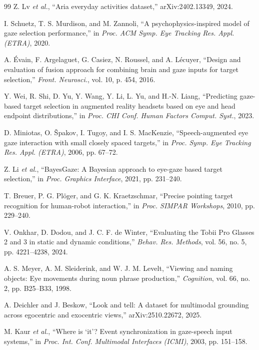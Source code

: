 \documentclass[letterpaper, 10 pt, conference]{ieeeconf}  %
\begin{document}
\begin{thebibliography}{99}
Z. Lv \emph{et al.}, ``Aria everyday activities dataset,''
arXiv:2402.13349, 2024.

I. Schuetz, T. S. Murdison, and M. Zannoli, ``A psychophysics-inspired
model of gaze selection performance,'' in \emph{Proc. ACM Symp. Eye
Tracking Res. Appl. (ETRA)}, 2020.

A. \'Evain, F. Argelaguet, G. Casiez, N. Roussel, and A. L\'ecuyer,
``Design and evaluation of fusion approach for combining brain and
gaze inputs for target selection,'' \emph{Front. Neurosci.}, vol. 10,
p. 454, 2016.

Y. Wei, R. Shi, D. Yu, Y. Wang, Y. Li, L. Yu, and H.-N. Liang,
``Predicting gaze-based target selection in augmented reality headsets
based on eye and head endpoint distributions,'' in \emph{Proc. CHI
Conf. Human Factors Comput. Syst.}, 2023.

D. Miniotas, O. \v{S}pakov, I. Tugoy, and I. S. MacKenzie,
``Speech-augmented eye gaze interaction with small closely spaced
targets,'' in \emph{Proc. Symp. Eye Tracking Res. Appl. (ETRA)},
2006, pp. 67--72.

Z. Li \emph{et al.}, ``BayesGaze: A Bayesian approach to eye-gaze
based target selection,'' in \emph{Proc. Graphics Interface}, 2021,
pp. 231--240.

T. Breuer, P. G. Pl\"oger, and G. K. Kraetzschmar, ``Precise pointing
target recognition for human-robot interaction,'' in \emph{Proc.
SIMPAR Workshops}, 2010, pp. 229--240.

V. Onkhar, D. Dodou, and J. C. F. de Winter, ``Evaluating the Tobii
Pro Glasses 2 and 3 in static and dynamic conditions,'' \emph{Behav.
Res. Methods}, vol. 56, no. 5, pp. 4221--4238, 2024.

A. S. Meyer, A. M. Sleiderink, and W. J. M. Levelt, ``Viewing and
naming objects: Eye movements during noun phrase production,''
\emph{Cognition}, vol. 66, no. 2, pp. B25--B33, 1998.

A. Deichler and J. Beskow, ``Look and tell: A dataset for multimodal
grounding across egocentric and exocentric views,''
arXiv:2510.22672, 2025.

M. Kaur \emph{et al.}, ``Where is `it'? Event synchronization in
gaze-speech input systems,'' in \emph{Proc. Int. Conf. Multimodal
Interfaces (ICMI)}, 2003, pp. 151--158.


\end{thebibliography}
\end{document}
